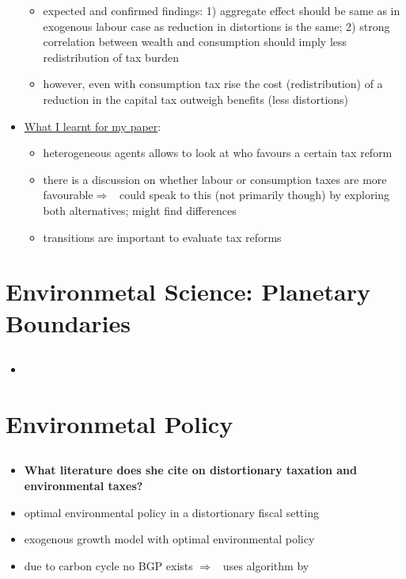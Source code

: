 \documentclass[12pt]{article}
\newcommand{\ar}{$\Rightarrow$ \ }
\begin{document}
\begin{itemize}
\begin{itemize}
\item expected and confirmed findings: 1) aggregate effect should be same as in exogenous labour case as reduction in distortions is the same; 2) strong correlation between wealth and consumption should imply less redistribution of tax burden
\item however, even with consumption tax rise the cost (redistribution) of a reduction in the capital tax outweigh benefits (less distortions)
\end{itemize}
\item \underline{What I learnt for my paper}:
\begin{itemize}
\item heterogeneous agents allows to look at who favours a certain tax reform
\item there is a discussion on whether labour or consumption taxes are more favourable\ar could speak to this (not primarily though) by exploring both alternatives; might find differences
\item transitions are important to evaluate tax reforms
\end{itemize}
\end{itemize}


\section{Environmetal Science: Planetary Boundaries}

\subsection{\cite{Rogelj2018MitigationDevelopment.}}
\begin{itemize}
	\item 
\end{itemize}
\section{Environmetal Policy}
\hypertarget{env}{}
\localtableofcontents

\subsection{\cite{Barrage2019OptimalPolicy} }
\begin{itemize}
	\item \textbf{What literature does she cite on distortionary taxation and environmental taxes?}
	\item optimal environmental policy in a distortionary fiscal setting
	\item exogenous growth model with optimal environmental policy 
	\item due to carbon cycle no BGP exists \ar uses algorithm by \cite{Jones1993OptimalGrowth}
\end{itemize}
\end{document}
